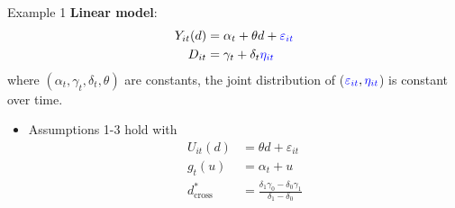 \documentclass[aspectratio=1610, 9pt]{beamer}
\begin{document}
\begin{frame}{Example 1}
 \textbf{Linear model}:
 \begin{align*}
     Y_{it}(d) & =\alpha_{t}+\theta d+ \textcolor{blue}{\varepsilon_{it}}\\
D_{it} & =\gamma_{t}+\delta_{t}\textcolor{blue}{\eta_{it}}
 \end{align*}where $(\alpha_{t},\gamma_{t},\delta_{t}, \theta)$ are constants, the joint distribution of ($\textcolor{blue}{\varepsilon_{it}},\textcolor{blue}{\eta_{it}}$) is constant over time.\\
\vspace{0.3cm}
\begin{itemize}
    \item Assumptions 1-3 hold with 
    \begin{align*}
        U_{it}(d)&=\theta d +\varepsilon_{it}\\
         g_t(u)&=\alpha_t+u \\
         d^*_{\text{cross}}&= \frac{\delta_1\gamma_0-\delta_0\gamma_1}{\delta_1-\delta_0}
    \end{align*}
\end{itemize}


\end{frame}


 
\end{document}
